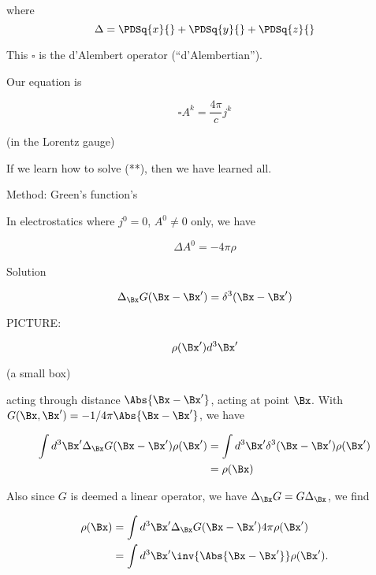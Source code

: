 where
\begin{equation}\label{eqn:relativisticElectrodynamicsL17b:291}
\Delta = \PDSq{x}{} + \PDSq{y}{} + \PDSq{z}{}
\end{equation}

This $\square$ is the d'Alembert operator (``d'Alembertian'').

Our equation is 

\begin{equation}\label{eqn:relativisticElectrodynamicsL17b:310}
\square A^k = \frac{4 \pi}{c} j^k
\end{equation}

(in the Lorentz gauge)

If we learn how to solve (**), then we have learned all.

Method: Green's function's

In electrostatics where $j^0 = 0$, $A^0 \ne 0$ only, we have

\begin{equation}\label{eqn:relativisticElectrodynamicsL17b:330}
\Delta A^0 = -4 \pi \rho
\end{equation}

Solution 

\begin{equation}\label{eqn:relativisticElectrodynamicsL17b:350}
\Delta_{\Bx} G(\Bx - \Bx') = \delta^3( \Bx - \Bx')
\end{equation}

PICTURE: 

\begin{equation}\label{eqn:relativisticElectrodynamicsL17b:370}
\rho(\Bx') d^3 \Bx'
\end{equation}

(a small box)

acting through distance $\Abs{\Bx - \Bx'}$, acting at point $\Bx$.  With $G(\Bx, \Bx') = -1/4 \pi\Abs{\Bx - \Bx'}$, we have

\begin{equation}\label{eqn:relativisticElectrodynamicsL17b:410}
\begin{aligned}
\int d^3 \Bx' \Delta_{\Bx} G(\Bx - \Bx') \rho(\Bx') 
&= \int d^3 \Bx' \delta^3( \Bx - \Bx') \rho(\Bx') \\
&= \rho(\Bx)
\end{aligned}
\end{equation}

Also since $G$ is deemed a linear operator, we have $\Delta_\Bx G = G \Delta_\Bx$, we find

\begin{equation}\label{eqn:relativisticElectrodynamicsL17b:430}
\begin{aligned}
\rho(\Bx)
&=
\int d^3 \Bx' \Delta_{\Bx} G(\Bx - \Bx') 4 \pi \rho(\Bx') \\
&=
\int d^3 \Bx' \inv{\Abs{\Bx - \Bx'}} \rho(\Bx').
\end{aligned}
\end{equation}

